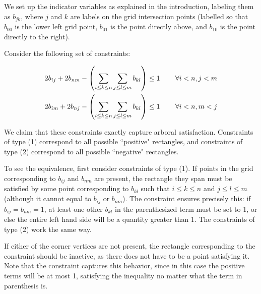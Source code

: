 \documentclass[11pt]{article}
\begin{document}
We set up the indicator variables as explained in the introduction, labeling them as $b_{jk}$, where $j$ and $k$ are labels on the grid intersection points (labelled so that $b_{00}$ is the lower left grid point, $b_{01}$ is the point directly above, and $b_{10}$ is the point directly to the right).

Consider the following set of constraints:

\begin{align}
2b_{ij} + 2b_{nm} - \left(\sum_{i \leq k \leq n}\sum_{j\leq l \leq m} b_{kl}\right) &\leq 1  \hspace{.3in} \forall i<n, j<m \\
2b_{im} + 2b_{nj} - \left(\sum_{i \leq k \leq n}\sum_{j\leq l \leq m} b_{kl}\right)  &\leq 1  \hspace{.3in} \forall i<n, m<j
\end{align}

We claim that these constraints exactly capture arboral satisfaction. Constraints of type (1) correspond to all possible ``positive" rectangles, and constraints of type (2) correspond to all possible ``negative" rectangles.

To see the equivalence, first consider constraints of type (1). If points in the grid corresponding to $b_{ij}$ and $b_{nm}$ are present, the rectangle they span must be satisfied by some point corresponding to $b_{kl}$ such that   $i\leq k \leq n$ and $j \leq l \leq m$ (although it cannot equal to $b_{ij}$ or $b_{nm}$). The constraint ensures precisely this: if $b_{ij} = b_{nm} = 1$, at least one other $b_{kl}$ in the parenthesized term must be set to 1, or else the entire left hand side will be a quantity greater than 1. The constraints of type (2) work the same way.

If either of the corner vertices are not present, the rectangle corresponding to the constraint should be inactive, as there does not have to be a point satisfying it. Note that the constraint captures this behavior, since in this case the positive terms will be at most 1, satisfying the inequality no matter what the term in parenthesis is.
\end{document}

